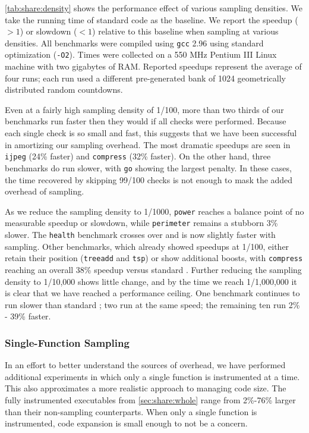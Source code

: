 \autoref{tab:share:density} shows the performance effect of various
sampling densities.  We take the running time of standard \CCured code
as the baseline.  We report the speedup ($>1$) or slowdown ($<1$)
relative to this baseline when sampling at various densities.  All
benchmarks were compiled using \texttt{gcc} 2.96 using standard
optimization (\texttt{-O2}).  Times were collected on a 550 MHz
Pentium III Linux machine with two gigabytes of RAM.  Reported
speedups represent the average of four runs; each run used a different
pre-generated bank of 1024 geometrically distributed random
countdowns.

Even at a fairly high sampling density of 1/100, more than two thirds
of our benchmarks run faster then they would if all checks were
performed.  Because each single check is so small and fast, this
suggests that we have been successful in amortizing our sampling
overhead.  The most dramatic speedups are seen in \texttt{ijpeg} (24\%
faster) and \texttt{compress} (32\% faster).  On the other hand, three
benchmarks do run slower, with \texttt{go} showing the largest
penalty.  In these cases, the time recovered by skipping 99/100 checks
is not enough to mask the added overhead of sampling.

As we reduce the sampling density to 1/1000, \texttt{power} reaches a
balance point of no measurable speedup or slowdown, while
\texttt{perimeter} remains a stubborn 3\% slower.  The \texttt{health}
benchmark crosses over and is now slightly faster with sampling.
Other benchmarks, which already showed speedups at 1/100, either
retain their position (\texttt{treeadd} and \texttt{tsp}) or show
additional boosts, with \texttt{compress} reaching an overall 38\%
speedup versus standard \CCured.  Further reducing the sampling
density to 1/10,000 shows little change, and by the time we reach
1/1,000,000 it is clear that we have reached a performance ceiling.
One benchmark continues to run slower than standard \CCured; two run
at the same speed; the remaining ten run 2\% - 39\% faster.

\subsubsection{Single-Function Sampling}

In an effort to better understand the sources of overhead, we have
performed additional experiments in which only a single function is
instrumented at a time.  This also approximates a more realistic
approach to managing code size.  The fully instrumented executables
from \autoref{sec:share:whole} range from 2\%-76\% larger than their
non-sampling counterparts.  When only a single function is
instrumented, code expansion is small enough to not be a concern.

